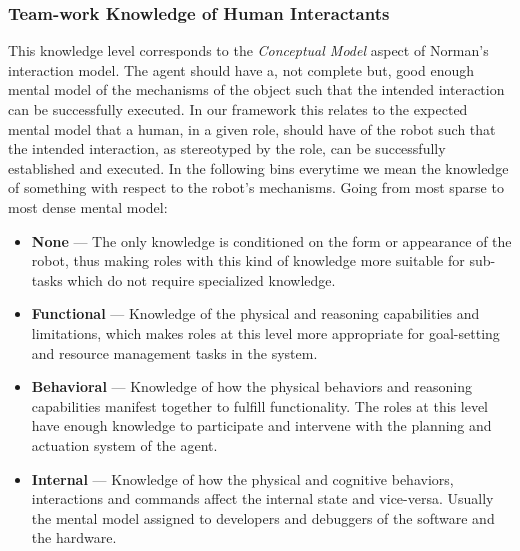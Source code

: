 \documentclass[letterpaper, 10 pt, conference]{ieeeconf} %
\theoremstyle{definition} \newtheorem{definition}{Definition}
\begin{document}
\subsubsection{Team-work Knowledge of Human Interactants}
This knowledge level corresponds to the \textit{Conceptual Model} aspect of
Norman's interaction model. The agent should have a, not complete but, good
enough mental model of the mechanisms of the object such that the intended
interaction can be successfully executed. In our framework this relates to the
expected mental model that a human, in a given role, should have of the robot
such that the intended interaction, as stereotyped by the role, can be
successfully established and executed. In the following bins everytime we mean
the knowledge of something with respect to the robot's mechanisms. Going from
most sparse to most dense mental model:
\begin{itemize}{}
  \item \textbf{None} --- The only knowledge is conditioned on the form or
    appearance of the robot, thus making roles with this kind of knowledge more
    suitable for sub-tasks which do not require specialized knowledge.
  \item \textbf{Functional} --- Knowledge of the physical and reasoning
    capabilities and limitations, which makes roles at this level more
    appropriate for goal-setting and resource management tasks in the system.
  \item \textbf{Behavioral} --- Knowledge of how the physical behaviors and
    reasoning capabilities manifest together to fulfill functionality. The roles
    at this level have enough knowledge to participate and intervene with the
    planning and actuation system of the agent.
  \item \textbf{Internal} --- Knowledge of how the physical and cognitive
    behaviors, interactions and commands affect the internal state and
    vice-versa. Usually the mental model assigned to developers and debuggers of
    the software and the hardware.
\end{itemize}
\end{document}

